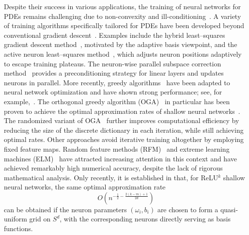 \documentclass{article}
\theoremstyle{remark}
\begin{document}
Despite their success in various applications, the training of neural networks for PDEs remains challenging due to non-convexity and ill-conditioning~\cite{HSTX:2022}. 
A variety of training algorithms specifically tailored for PDEs 
have been developed beyond conventional gradient descent~\cite{GBC:2016}. 
Examples include the hybrid least–squares gradient descent method~\cite{CGPPT:2020}, 
motivated by the adaptive basis viewpoint, and the active neuron least–squares method~\cite{AS:2021,AS:2022}, 
which adjusts neuron positions adaptively to escape training plateaus. 
The neuron-wise parallel subspace correction method~\cite{PXX:2022} provides a 
preconditioning strategy for linear layers and updates neurons in parallel. 
More recently, greedy algorithms~\cite{DT:1996,Jones:1992,MZ:1993,Temlyakov:2011} 
have been adapted to neural network optimization and have shown strong performance; 
see, for example,~\cite{DPW:2021,siegel2023greedy,SX:2022a}. 
The orthogonal greedy algorithm (OGA)~\cite{siegel2023greedy,SX:2022a} in particular has been 
proven to achieve the optimal approximation rates of shallow neural networks~\cite{SX:2024}. 
The randomized variant of OGA~\cite{XX:2025} further improves computational 
efficiency by reducing the size of the discrete dictionary in each iteration, 
while still achieving optimal rates.
Other approaches avoid iterative training altogether by employing fixed feature maps. 
Random feature methods (RFM)~\cite{CCEY:2022,EMW:2020,LL:2024,RR:2007} and extreme learning machines (ELM)~\cite{DL:2021,HZS:2006,LLR:2024} have attracted increasing attention in this context and have achieved remarkably high numerical accuracy, despite the lack of rigorous mathematical analysis.
Only recently, it is established in \cite{LMX2025, MX:2025lower} that, for ReLU$^k$ shallow neural networks, the same optimal 
approximation rate
\[
O\!\left(n^{-\frac{1}{2} - \frac{2(k-m)+1}{2d}}\right)
\]
can be obtained if the neuron parameters $(\omega_i,b_i)$ are chosen to form a quasi-uniform grid on $S^d$, with the corresponding neurons directly serving 
as basis functions.
\end{document}
